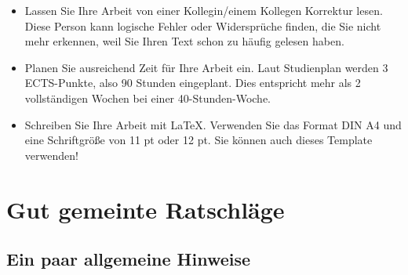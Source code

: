 \documentclass[a4paper,11pt,bibliography=totoc,listof=totoc,headinclude=true,cleardoublepage=empty,oneside]{scrbook}
\begin{document}
{\begin{itemize}
\item Lassen Sie Ihre Arbeit von einer Kollegin/einem Kollegen Korrektur lesen.
Diese Person kann logische Fehler oder Widersprüche finden, die Sie nicht mehr
erkennen, weil Sie Ihren Text schon zu häufig gelesen haben.

\item Planen Sie ausreichend Zeit für Ihre Arbeit ein. Laut Studienplan
werden 3 ECTS-Punkte, also 90 Stunden eingeplant. Dies entspricht mehr
als 2 vollständigen Wochen bei einer 40-Stunden-Woche. 

\item Schreiben Sie Ihre Arbeit mit \LaTeX. Verwenden Sie das Format DIN A4 und eine Schriftgröße von 11 pt
oder 12 pt. Sie können auch dieses Template verwenden!

\end{itemize}
}

\chapter{Gut gemeinte Ratschläge}
\label{chapter:auxiliary}

\section{Ein paar allgemeine Hinweise}
\end{document}
